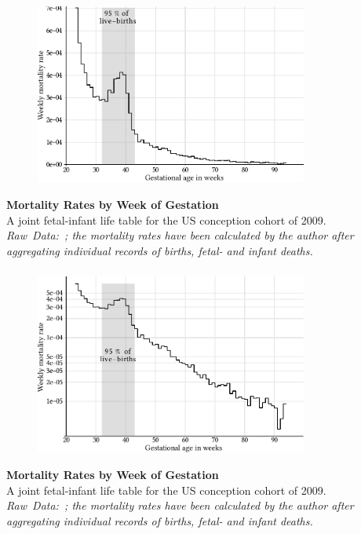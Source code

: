 \documentclass{beamer}
\begin{document}
\begin{frame}
\frametitle{\insertsection}

\begin{figure}[htb!]
\includegraphics[width = 0.8\textwidth]{./fig/us_fimort_2009_mx.pdf}\\
\end{figure}

\footnotesize\textbf{Mortality Rates by Week of Gestation}\\
A joint fetal-infant life table for the US conception cohort of 2009.\\
\scriptsize\emph{Raw~Data:~\textcite{DVS2015}; the mortality rates have been calculated by the author after aggregating individual records of births, fetal- and infant deaths.}

\end{frame}


\begin{frame}
\frametitle{\insertsection}

\begin{figure}[htb!]
\includegraphics[width = 0.8\textwidth]{./fig/us_fimort_2009_log_mx.pdf}\\
\end{figure}

\footnotesize\textbf{Mortality Rates by Week of Gestation}\\
A joint fetal-infant life table for the US conception cohort of 2009.\\
\scriptsize\emph{Raw~Data:~\textcite{DVS2015}; the mortality rates have been calculated by the author after aggregating individual records of births, fetal- and infant deaths.}

\end{frame}
\end{document}
